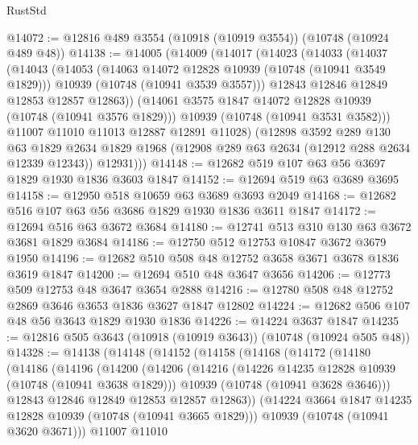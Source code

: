\begin{lexlean}{RustStd}
\begin{coremodule}
@14072 := @12816 @489 @3554 (@10918 (@10919 @3554)) (@10748 (@10924 @489 @48))
@14138 := @14005
    (@14009
      (@14017
        (@14023
          (@14033
            (@14037
              (@14043
                (@14053
                  (@14063 @14072 @12828 @10939 (@10748 (@10941 @3549 @1829)))
                  @10939
                  (@10748 (@10941 @3539 @3557)))
                @12843
                @12846
                @12849
                @12853
                @12857
                @12863))
            (@14061 @3575 @1847 @14072 @12828 @10939 (@10748 (@10941 @3576 @1829)))
            @10939
            (@10748 (@10941 @3531 @3582)))
          @11007
          @11010
          @11013
          @12887
          @12891
          @11028)
        (@12898
          @3592
          @289
          @130
          @63
          @1829
          @2634
          @1829
          @1968
          (@12908 @289 @63 @2634 (@12912 @288 @2634 @12339 @12343))
          @12931)))
@14148 := @12682 @519 @107 @63 @56 @3697 @1829 @1930 @1836 @3603 @1847
@14152 := @12694 @519 @63 @3689 @3695
@14158 := @12950 @518 @10659 @63 @3689 @3693 @2049
@14168 := @12682 @516 @107 @63 @56 @3686 @1829 @1930 @1836 @3611 @1847
@14172 := @12694 @516 @63 @3672 @3684
@14180 := @12741 @513 @310 @130 @63 @3672 @3681 @1829 @3684
@14186 := @12750 @512 @12753 @10847 @3672 @3679 @1950
@14196 := @12682 @510 @508 @48 @12752 @3658 @3671 @3678 @1836 @3619 @1847
@14200 := @12694 @510 @48 @3647 @3656
@14206 := @12773 @509 @12753 @48 @3647 @3654 @2888
@14216 := @12780 @508 @48 @12752 @2869 @3646 @3653 @1836 @3627 @1847 @12802
@14224 := @12682 @506 @107 @48 @56 @3643 @1829 @1930 @1836
@14226 := @14224 @3637 @1847
@14235 := @12816 @505 @3643 (@10918 (@10919 @3643)) (@10748 (@10924 @505 @48))
@14328 := @14138
    (@14148
      (@14152
        (@14158
          (@14168
            (@14172
              (@14180
                (@14186
                  (@14196
                    (@14200
                      (@14206
                        (@14216
                          (@14226 @14235 @12828 @10939 (@10748 (@10941 @3638 @1829)))
                          @10939
                          (@10748 (@10941 @3628 @3646)))
                        @12843
                        @12846
                        @12849
                        @12853
                        @12857
                        @12863))
                    (@14224 @3664 @1847 @14235 @12828 @10939 (@10748 (@10941 @3665 @1829)))
                    @10939
                    (@10748 (@10941 @3620 @3671)))
                  @11007
                  @11010

\end{coremodule}
\end{lexlean}
